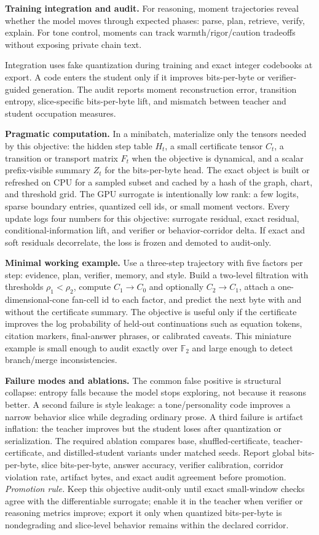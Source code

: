 \documentclass[10pt]{article}
\newcommand{\FF}{\mathbb{F}}
\numberwithin{equation}{section}
\begin{document}
\noindent\textbf{Training integration and audit.} For reasoning, moment trajectories reveal whether the model moves through expected phases: parse, plan, retrieve, verify, explain. For tone control, moments can track warmth/rigor/caution tradeoffs without exposing private chain text.

Integration uses fake quantization during training and exact integer codebooks at export. A code enters the student only if it improves bits-per-byte or verifier-guided generation. The audit reports moment reconstruction error, transition entropy, slice-specific bits-per-byte lift, and mismatch between teacher and student occupation measures.

\noindent\textbf{Pragmatic computation.} In a minibatch, materialize only the tensors needed by this objective: the hidden step table $H_t$, a small certificate tensor $C_t$, a transition or transport matrix $F_t$ when the objective is dynamical, and a scalar prefix-visible summary $Z_t$ for the bits-per-byte head. The exact object is built or refreshed on CPU for a sampled subset and cached by a hash of the graph, chart, and threshold grid. The GPU surrogate is intentionally low rank: a few logits, sparse boundary entries, quantized cell ids, or small moment vectors. Every update logs four numbers for this objective: surrogate residual, exact residual, conditional-information lift, and verifier or behavior-corridor delta. If exact and soft residuals decorrelate, the loss is frozen and demoted to audit-only.

\noindent\textbf{Minimal working example.} Use a three-step trajectory with five factors per step: evidence, plan, verifier, memory, and style. Build a two-level filtration with thresholds $\rho_1<\rho_2$, compute $C_1\to C_0$ and optionally $C_2\to C_1$, attach a one-dimensional-cone fan-cell id to each factor, and predict the next byte with and without the certificate summary. The objective is useful only if the certificate improves the log probability of held-out continuations such as equation tokens, citation markers, final-answer phrases, or calibrated caveats. This miniature example is small enough to audit exactly over $\FF_2$ and large enough to detect branch/merge inconsistencies.

\noindent\textbf{Failure modes and ablations.} The common false positive is structural collapse: entropy falls because the model stops exploring, not because it reasons better. A second failure is style leakage: a tone/personality code improves a narrow behavior slice while degrading ordinary prose. A third failure is artifact inflation: the teacher improves but the student loses after quantization or serialization. The required ablation compares base, shuffled-certificate, teacher-certificate, and distilled-student variants under matched seeds. Report global bits-per-byte, slice bits-per-byte, answer accuracy, verifier calibration, corridor violation rate, artifact bytes, and exact audit agreement before promotion.
\vfill
\noindent\emph{Promotion rule.} Keep this objective audit-only until exact small-window checks agree with the differentiable surrogate; enable it in the teacher when verifier or reasoning metrics improve; export it only when quantized bits-per-byte is nondegrading and slice-level behavior remains within the declared corridor.
\clearpage
\end{document}
